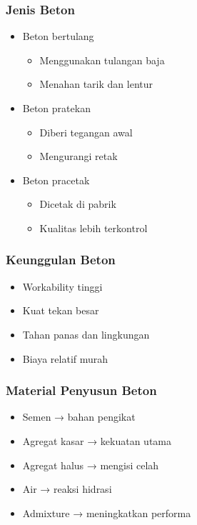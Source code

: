 \documentclass[../main.tex]{subfiles}
\begin{document}
\begin{frame}[mytitle=standard,t,mybg=bglight3,light]\frametitle{Jenis Beton}
	\begin{itemize}
		\item Beton bertulang
		      \begin{itemize}
			      \item Menggunakan tulangan baja
			      \item Menahan tarik dan lentur
		      \end{itemize}
		\item Beton pratekan
		      \begin{itemize}
			      \item Diberi tegangan awal
			      \item Mengurangi retak
		      \end{itemize}
		\item Beton pracetak
		      \begin{itemize}
			      \item Dicetak di pabrik
			      \item Kualitas lebih terkontrol
		      \end{itemize}
	\end{itemize}\end{frame}

\begin{frame}[mytitle=standard,t,mybg=bglight2,light]\frametitle{Keunggulan Beton}
	\begin{itemize}
		\item Workability tinggi
		\item Kuat tekan besar
		\item Tahan panas dan lingkungan
		\item Biaya relatif murah
	\end{itemize}\end{frame}

\begin{frame}[mytitle=standard,t,mycolor=digiPH_cream,light]\frametitle{Material Penyusun Beton}
	\begin{itemize}
		\item Semen → bahan pengikat
		\item Agregat kasar → kekuatan utama
		\item Agregat halus → mengisi celah
		\item Air → reaksi hidrasi
		\item Admixture → meningkatkan performa
	\end{itemize}\end{frame}
\end{document}

